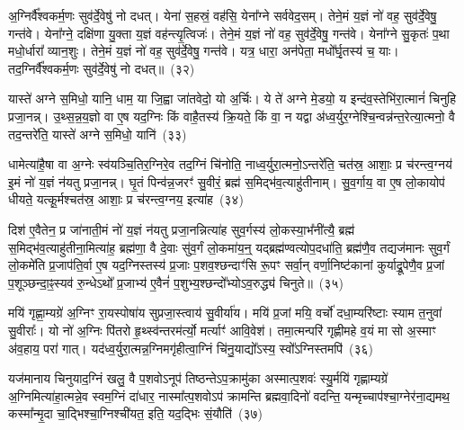 अ॒ग्निर्वै᳚श्वकर्म॒णः सुव॑र्दे॒वेषु॑ नो दधत्। येना॑ स॒हस्रं॒ वह॑सि॒ येना᳚ग्ने सर्ववेद॒सम्। तेने॒मं य॒ज्ञं नो॑ वह॒ सुव॑र्दे॒वेषु॒ गन्त॑वे। येना᳚ग्ने॒ दक्षि॑णा यु॒क्ता य॒ज्ञं वह॑न्त्यृ॒त्विजः॑। तेने॒मं य॒ज्ञं नो॑ वह॒ सुव॑र्दे॒वेषु॒ गन्त॑वे। येना᳚ग्ने सु॒कृतः॑ प॒था मधो॒र्धारा᳚ व्यान॒शुः। तेने॒मं य॒ज्ञं नो॑ वह॒ सुव॑र्दे॒वेषु॒ गन्त॑वे। यत्र॒ धारा॒ अन॑पेता॒ मधो᳚र्घृ॒तस्य॑ च॒ याः। तद॒ग्निर्वै᳚श्वकर्म॒णः सुव॑र्दे॒वेषु॑ नो दधत्॥~(३२)

{\anuvakamend[{आ॒गच्छा॒त्तद्व्या॑न॒शुस्तेने॒मं य॒ज्ञं नो॑ वह॒ सुव॑र्दे॒वेषु॒ गन्त॑वे॒ चतु॑र्दश च}]}%

यास्ते॑ अग्ने स॒मिधो॒ यानि॒ धाम॒ या जि॒ह्वा जा॑तवेदो॒ यो अ॒र्चिः। ये ते॑ अग्ने मे॒डयो॒ य इन्द॑व॒स्तेभि॑रा॒त्मानं॑ चिनुहि प्रजा॒नन्न्। उ॒थ्स॒न्न॒य॒ज्ञो वा ए॒ष यद॒ग्निः किं वाहै॒तस्य॑ क्रि॒यते॒ किं वा॒ न यद्वा अ॑ध्व॒र्युर॒ग्नेश्चि॒न्वन्न॑न्त॒रेत्या॒त्मनो॒ वै तद॒न्तरे॑ति॒ यास्ते॑ अग्ने स॒मिधो॒ यानि॑~(३३)

धामेत्या॑है॒षा वा अ॒ग्नेः स्व॑यञ्चि॒तिर॒ग्निरे॒व तद॒ग्निं चि॑नोति॒ नाध्व॒र्युरा॒त्मनो॒\-ऽन्तरे॑ति॒ चत॑स्र॒ आशाः॒ प्र च॑रन्त्व॒ग्नय॑ इ॒मं नो॑ य॒ज्ञं न॑यतु प्रजा॒नन्न्। घृ॒तं पिन्व॑न्न॒जरꣳ॑ सु॒वीरं॒ ब्रह्म॑ स॒मिद्भ॑व॒त्याहु॑तीनाम्। सु॒व॒र्गाय॒ वा ए॒ष लो॒कायोप॑ धीयते॒ यत्कू॒र्मश्चत॑स्र॒ आशाः॒ प्र च॑रन्त्व॒ग्नय॒ इत्या॑ह~(३४)

दिश॑ ए॒वैतेन॒ प्र जा॑नाती॒मं नो॑ य॒ज्ञं न॑यतु प्रजा॒नन्नित्या॑ह सुव॒र्गस्य॑ लो॒कस्या॒भ᳚नी॑त्यै॒ ब्रह्म॑ स॒मिद्भ॑व॒त्याहु॑तीना॒मित्या॑ह॒ ब्रह्म॑णा॒ वै दे॒वाः सु॑व॒र्गं लो॒कमा॑य॒न्॒ यद्ब्रह्म॑ण्वत्योप॒दधा॑ति॒ ब्रह्म॑णै॒व तद्यज॑मानः सुव॒र्गं लो॒कमे॑ति प्र॒जा\-प॑ति॒र्वा ए॒ष यद॒ग्निस्तस्य॑ प्र॒जाः प॒शव॒श्छन्दाꣳ॑सि रू॒पꣳ सर्वा॒न् वर्णा॒निष्ट॑कानां कुर्याद्रू॒पेणै॒व प्र॒जां प॒शूञ्छन्दा॒ꣴ॒स्यव॑ रु॒न्धे\-ऽथो᳚ प्र॒जाभ्य॑ ए॒वैनं॑ प॒शुभ्य॒श्छन्दो᳚भ्यो\-ऽव॒रुद्ध्य॑ चिनुते॥~(३५)

{\anuvakamend[{यान्य॒ग्नय॒ इत्या॒हेष्ट॑काना॒ꣳ॒ षोड॑श च}]}%

मयि॑ गृह्णा॒म्यग्रे॑ अ॒ग्निꣳ रा॒यस्पोषा॑य सुप्रजा॒स्त्वाय॑ सु॒वीर्या॑य। मयि॑ प्र॒जां मयि॒ वर्चो॑ दधा॒म्यरि॑ष्टाः स्याम त॒नुवा॑ सु॒वीराः᳚। यो नो॑ अ॒ग्निः पि॑तरो हृ॒थ्स्व॑न्तरम॑र्त्यो॒ मर्त्याꣳ॑ आवि॒वेश॑। तमा॒त्मन्परि॑ गृह्णीमहे व॒यं मा सो अ॒स्माꣳ अ॑व॒हाय॒ परा॑ गात्। यद॑ध्व॒र्युरा॒त्मन्न॒ग्निमगृ॑हीत्वा॒ग्निं चि॑नु॒याद्यो᳚\-ऽस्य॒ स्वो᳚\-ऽग्निस्तमपि॑~(३६)

यज॑मानाय चिनुयाद॒ग्निं खलु॒ वै प॒शवो\-ऽनूप॑ तिष्ठन्ते\-ऽप॒क्रामु॑का अस्मात्प॒शवः॑ स्यु॒र्मयि॑ गृह्णाम्यग्रे॑ अ॒ग्निमित्या॑हा॒त्मन्ने॒व स्वम॒ग्निं दा॑धार॒ नास्मा᳚त्प॒शवो\-ऽप॑ क्रामन्ति ब्रह्मवा॒दिनो॑ वदन्ति॒ यन्मृच्चाप॑श्चा॒ग्नेर॑ना॒द्यमथ॒ कस्मा᳚न्मृ॒दा चा॒द्भिश्चा॒ग्निश्ची॑यत॒ इति॒ यद॒द्भिः सं॒यौति॑~(३७)

